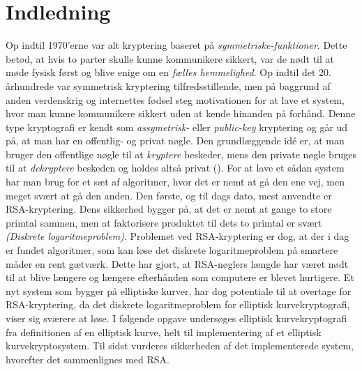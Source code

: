 \section{Indledning}

Op indtil 1970'erne var alt kryptering baseret på \textit{symmetriske-funktioner}. Dette betød, at hvis to parter skulle kunne kommunikere sikkert, var de nødt til at møde fysisk først og blive enige om en \textit{fælles hemmelighed}. Op indtil det 20. århundrede var symmetrisk kryptering tilfredsstillende, men på baggrund af anden verdenskrig og internettes fødsel steg motivationen for at lave et system, hvor man kunne kommunikere sikkert uden at kende hinanden på forhånd.
Denne type kryptografi er kendt som \textit{assymetrisk-} eller \textit{public-key} kryptering og går ud på, at man har en offentlig- og privat nøgle. Den grundlæggende idé er, at man bruger den offentlige nøgle til at \textit{kryptere} beskeder, mens den private nøgle bruges til at \textit{dekryptere} beskeden og holdes altså privat (\cite{seanriley2017}). For at lave et sådan system har man brug for et sæt af algoritmer, hvor det er nemt at gå den ene vej, men meget svært at gå den anden. Den første, og til dags dato, mest anvendte er RSA-kryptering. Dens sikkerhed bygger på, at det er nemt at gange to store primtal sammen, men at faktorisere produktet til dets to primtal er svært \textit{(Diskrete logaritmeproblem)}. Problemet ved RSA-kryptering er dog, at der i dag er fundet algoritmer, som kan løse det diskrete logaritmeproblem på smartere måder en rent gætværk.  Dette har gjort, at RSA-nøglers længde har været nødt til at blive længere og længere efterhånden som computere er blevet hurtigere. Et nyt system som bygger på elliptiske kurver, har dog potentiale til at overtage for RSA-kryptering, da det diskrete logaritmeproblem for elliptisk kurvekryptografi, viser sig sværere at løse. 
I følgende opgave undersøges elliptisk kurvekryptografi fra definitionen af en elliptisk kurve, helt til implementering af et elliptisk kurvekryptosystem. Til sidst vurderes sikkerheden af det implementerede system, hvorefter det sammenlignes med RSA. 